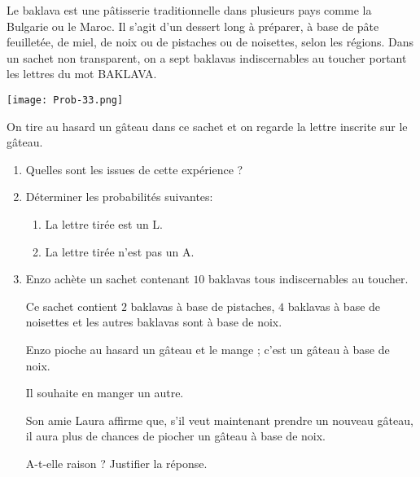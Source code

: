 
Le baklava est une pâtisserie traditionnelle dans plusieurs pays comme la Bulgarie ou
le Maroc. Il s'agit d'un dessert long à préparer, à base de pâte feuilletée, de miel, de
noix ou de pistaches ou de noisettes, selon les régions.
Dans un sachet non transparent, on a sept baklavas indiscernables au toucher portant
les lettres du mot BAKLAVA.
\begin{center}
\texttt{[image: Prob-33.png]} 
\end{center}

On tire au hasard un gâteau dans ce sachet et on regarde la lettre inscrite sur le
gâteau.

\medskip

\begin{enumerate}
\item Quelles sont les issues de cette expérience ?
\item Déterminer les probabilités suivantes:
	\begin{enumerate}
		\item La lettre tirée est un L.
		\item La lettre tirée n'est pas un A.
	\end{enumerate}
\item  Enzo achète un sachet contenant $10$ baklavas tous indiscernables au toucher.
	
Ce sachet contient $2$ baklavas à base de pistaches, $4$ baklavas à base de noisettes
et les autres baklavas sont à base de noix.
	
Enzo pioche au hasard un gâteau et le mange ; c'est un gâteau à base de noix. 

Il souhaite en manger un autre.

Son amie Laura affirme que, s'il veut maintenant prendre un nouveau gâteau, il
aura plus de chances de piocher un gâteau à base de noix.

A-t-elle raison ? Justifier la réponse.
\end{enumerate}